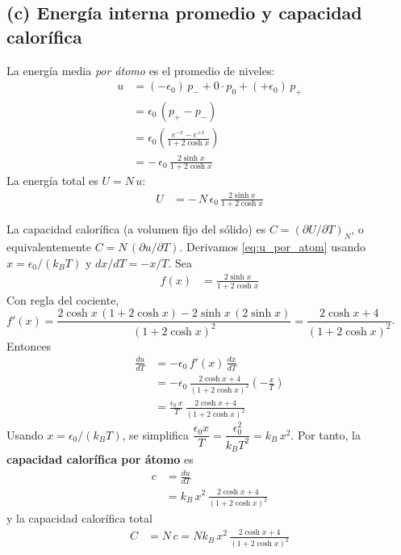 \documentclass{article}
\begin{document}
\subsection*{(c) Energía interna promedio y capacidad calorífica}

La energía media \textit{por átomo} es el promedio de niveles:
\begin{equation}
\begin{split}
u
&= (-\epsilon_0)\,p_{-} + 0\cdot p_{0} + (+\epsilon_0)\,p_{+}\\
&= \epsilon_0\,(p_{+}-p_{-})\\
&= \epsilon_0\left(\frac{e^{-x}-e^{+x}}{1+2\cosh x}\right)\\
&= -\,\epsilon_0\,\frac{2\sinh x}{1+2\cosh x}
\end{split}\label{eq:u_por_atom}
\end{equation}
La energía total es $U=N\,u$:
\begin{equation}
\begin{split}
U
&= -\,N\,\epsilon_0\,\frac{2\sinh x}{1+2\cosh x}
\end{split}\label{eq:U_total}
\end{equation}

La capacidad calorífica (a volumen fijo del sólido) es $C = (\partial U/\partial T)_{N}$, o equivalentemente $C=N\,(\partial u/\partial T)$. Derivamos \eqref{eq:u_por_atom} usando $x=\epsilon_0/(k_B T)$ y $dx/dT=-x/T$. Sea
\begin{equation}
\begin{split}
f(x)
&= \frac{2\sinh x}{1+2\cosh x}
\end{split}\label{eq:def_f}
\end{equation}
Con regla del cociente, $f'(x)=\dfrac{2\cosh x\,(1+2\cosh x)-2\sinh x\,(2\sinh x)}{(1+2\cosh x)^2}=\dfrac{2\cosh x+4}{(1+2\cosh x)^2}$. Entonces
\begin{equation}
\begin{split}
\frac{du}{dT}
&= -\epsilon_0\,f'(x)\,\frac{dx}{dT}\\
&= -\epsilon_0\,\frac{2\cosh x+4}{\left(1+2\cosh x\right)^2}\left(-\frac{x}{T}\right)\\
&= \frac{\epsilon_0\,x}{T}\,\frac{2\cosh x+4}{\left(1+2\cosh x\right)^2}
\end{split}\label{eq:du_dT_intermedio}
\end{equation}
Usando $x=\epsilon_0/(k_B T)$, se simplifica $\dfrac{\epsilon_0 x}{T}=\dfrac{\epsilon_0^2}{k_B T^2}=k_B\,x^2$. Por tanto, la \textbf{capacidad calorífica por átomo} es
\begin{equation}
\begin{split}
c
&= \frac{du}{dT}\\
&= k_B\,x^2\,\frac{2\cosh x+4}{\left(1+2\cosh x\right)^2}
\end{split}\label{eq:c_por_atom}
\end{equation}
y la capacidad calorífica total
\begin{equation}
\begin{split}
C
&= N\,c
= N k_B\,x^2\,\frac{2\cosh x+4}{\left(1+2\cosh x\right)^2}
\end{split}\label{eq:C_total}
\end{equation}
\end{document}

